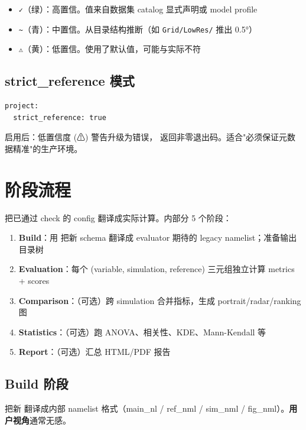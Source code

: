 \begin{itemize}
  \item \texttt{✓}（绿）：高置信。值来自数据集 catalog 显式声明或 model profile
  \item \texttt{\textasciitilde}（青）：中置信。从目录结构推断（如 \texttt{Grid/LowRes/} 推出 0.5°）
  \item \texttt{⚠}（黄）：低置信。使用了默认值，可能与实际不符
\end{itemize}

\subsection{strict\_reference 模式}

\begin{verbatim}
project:
  strict_reference: true
\end{verbatim}

启用后：低置信度 (⚠) 警告升级为错误， 返回非零退出码。适合"必须保证元数据精准"的生产环境。

\section{ 阶段流程}

 把已通过 check 的 config 翻译成实际计算。内部分 5 个阶段：

\begin{enumerate}
  \item \textbf{Build}：用  把新 schema 翻译成 evaluator 期待的 legacy namelist；准备输出目录树
  \item \textbf{Evaluation}：每个 (variable, simulation, reference) 三元组独立计算 metrics + scores
  \item \textbf{Comparison}：（可选）跨 simulation 合并指标，生成 portrait/radar/ranking 图
  \item \textbf{Statistics}：（可选）跑 ANOVA、相关性、KDE、Mann-Kendall 等
  \item \textbf{Report}：（可选）汇总 HTML/PDF 报告
\end{enumerate}

\subsection{Build 阶段}

把新  翻译成内部 namelist 格式（main\_nl / ref\_nml / sim\_nml / fig\_nml）。\textbf{用户视角}通常无感。

